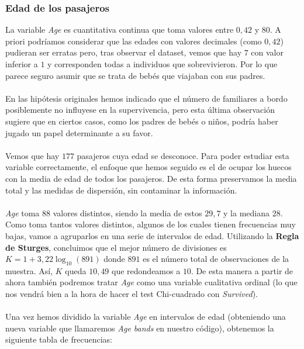 \documentclass{article}
\begin{document}
\newpage
\subsubsection{Edad de los pasajeros}
La variable \textit{Age} es cuantitativa continua que toma valores entre $0,42$ y $80$. A priori podríamos considerar que las edades con valores decimales (como $0,42$) pudieran ser erratas pero, tras observar el dataset, vemos que hay $7$ con valor inferior a $1$ y corresponden todas a individuos que sobrevivieron. Por lo que parece seguro asumir que se trata de bebés que viajaban con sus padres.\\\\
En las hipótesis originales hemos indicado que el número de familiares a bordo posiblemente no influyese en la supervivencia, pero esta última observación sugiere que en ciertos casos, como los padres de bebés o niños, podría haber jugado un papel determinante a su favor.\\\\
Vemos que hay $177$ pasajeros cuya edad se desconoce. Para poder estudiar esta variable correctamente, el enfoque que hemos seguido es el de ocupar los huecos con la media de edad de todos los pasajeros. De esta forma preservamos la media total y las medidas de dispersión, sin contaminar la información.\\\\
\textit{Age} toma 88 valores distintos, siendo la media de estos $29,7$ y la mediana $28$. Como toma tantos valores distintos, algunos de los cuales tienen frecuencias muy bajas, vamos a agruparlos en una serie de intervalos de edad. Utilizando la \textbf{Regla de Sturges}, concluimos que el mejor número de divisiones es $K=1+3,22\log_{10}(891)$ donde $891$ es el número total de observaciones de la muestra. Así, $K$ queda $10,49$ que redondeamos a $10$. De esta manera a partir de ahora también podremos tratar \textit{Age} como una variable cualitativa ordinal (lo que nos vendrá bien a la hora de hacer el test Chi-cuadrado con \textit{Survived}).\\\\
Una vez hemos dividido la variable \textit{Age} en intervalos de edad (obteniendo una nueva variable que llamaremos \textit{Age bands} en nuestro código), obtenemos la siguiente tabla de frecuencias:
\end{document}
